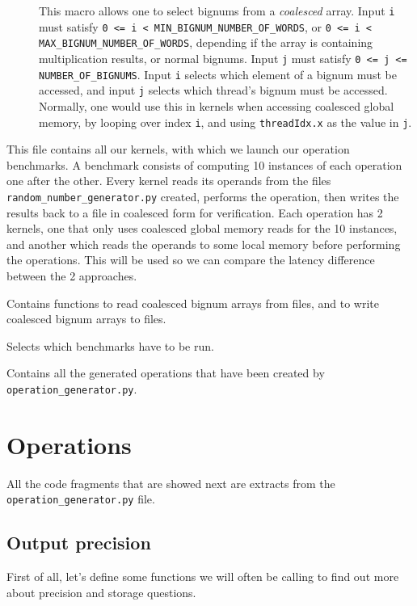 \documentclass[12pt, a4paper]{report}
\begin{document}
\begin{description}
\begin{description}
\item[] This macro allows one to select bignums from a
\emph{coalesced} array.
Input \verb+i+ must satisfy \verb+0 <= i < MIN_BIGNUM_NUMBER_OF_WORDS+, or
\verb+0 <= i < MAX_BIGNUM_NUMBER_OF_WORDS+, depending if the array is containing
multiplication results, or normal bignums.
Input \verb+j+ must satisfy \verb+0 <= j <= NUMBER_OF_BIGNUMS+.
Input \verb+i+ selects which element of a bignum must be accessed, and input
\verb+j+ selects which thread's bignum must be accessed.
Normally, one would use this in kernels when accessing coalesced global memory,
by looping over index \verb+i+, and using \verb+threadIdx.x+ as the value in
\verb+j+.
\end{description}

\item[\Q{benchmarks.cu}]
This file contains all our kernels, with which we launch our operation
benchmarks.
A benchmark consists of computing 10 instances of each operation one after the
other.
Every kernel reads its operands from the files \verb+random_number_generator.py+
created, performs the operation, then writes the results back to a file in
coalesced form for verification.
Each operation has 2 kernels, one that only uses coalesced global memory reads
for the 10 instances, and another which reads the operands to some local memory
before performing the operations.
This will be used so we can compare the latency difference between the 2
approaches.

\item[\Q{input_output.cpp}]
Contains functions to read coalesced bignum arrays from files, and to write
coalesced bignum arrays to files.

\item[\Q{main.cu}]
Selects which benchmarks have to be run.

\item[\Q{operations.h}]
Contains all the generated operations that have been created by
\verb+operation_generator.py+.
\end{description}

\section{Operations}
All the code fragments that are showed next are extracts from the
\verb+operation_generator.py+ file.

\subsection{Output precision}
First of all, let's define some functions we will often be calling to find out
more about precision and storage questions.
\end{document}
